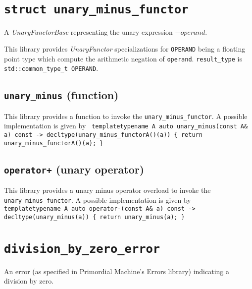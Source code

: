 \documentclass[oneside]{book}
\begin{document}
\section{\texttt{struct unary\_minus\_functor}}
A \textit{UnaryFunctorBase} representing the unary expression $-\textit{operand}$.\newline

\noindent{}This library provides \textit{UnaryFunctor}            specializations for
\texttt{OPERAND} being a floating point type which compute the arithmetic    negation
of \texttt{operand}. \texttt{result\_type} is \texttt{std::common\_type\_t\textlangle
OPERAND\textrangle}.

\subsection{\texttt{unary\_minus} (function)}
This library provides a function to invoke the \texttt{unary\_minus\_functor}.
A possible implementation is given by\newline
\texttt{
template\textlangle typename A\textrangle\newline
auto unary\_minus(const A\& a) const -> decltype(unary\_minus\_functor\textlangle A\textrangle()(a))\newline
\{ return unary\_minus\_functor\textlangle A\textrangle()(a); \}
}

\subsection{\texttt{operator+} (unary operator)}
This library provides a unary minus operator overload to invoke the \texttt{unary\_minus\_functor}.
A possible implementation is given by\newline
\texttt{
template\textlangle typename A\textrangle\newline
auto operator-(const A\& a) const -> decltype(unary\_minus(a))\newline
\{ return unary\_minus(a); \}
}

\section{\texttt{division\_by\_zero\_error}}
An error (as specified in Primordial Machine's Errors library) indicating a division by zero.
\end{document}

